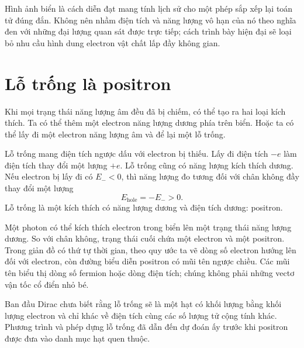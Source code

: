 Hình ảnh biển là cách diễn đạt mang tính lịch sử cho một phép sắp xếp lại toán tử đúng đắn. Không nên nhầm điện tích và năng lượng vô hạn của nó theo nghĩa đen với những đại lượng quan sát được trực tiếp; cách trình bày hiện đại sẽ loại bỏ nhu cầu hình dung electron vật chất lấp đầy không gian.

\section{Lỗ trống là positron}

Khi mọi trạng thái năng lượng âm đều đã bị chiếm, có thể tạo ra hai loại kích thích. Ta có thể thêm một electron năng lượng dương phía trên biển. Hoặc ta có thể lấy đi một electron năng lượng âm và để lại một lỗ trống.

Lỗ trống mang điện tích ngược dấu với electron bị thiếu. Lấy đi điện tích \(-e\) làm điện tích thay đổi một lượng \(+e\). Lỗ trống cũng có năng lượng kích thích dương. Nếu electron bị lấy đi có \(E_-<0\), thì năng lượng đo tương đối với chân không đầy thay đổi một lượng
\begin{equation}
E_{\mathrm{hole}}=-E_->0.
\end{equation}
Lỗ trống là một kích thích có năng lượng dương và điện tích dương: positron.

Một photon có thể kích thích electron trong biển lên một trạng thái năng lượng dương. So với chân không, trạng thái cuối chứa một electron và một positron. Trong giản đồ có thứ tự thời gian, theo quy ước ta vẽ dòng số electron hướng lên đối với electron, còn đường biểu diễn positron có mũi tên ngược chiều. Các mũi tên biểu thị dòng số fermion hoặc dòng điện tích; chúng không phải những vectơ vận tốc cổ điển nhỏ bé.

\begin{classroomqa}
\end{classroomqa}

Ban đầu Dirac chưa biết rằng lỗ trống sẽ là một hạt có khối lượng bằng khối lượng electron và chỉ khác về điện tích cùng các số lượng tử cộng tính khác. Phương trình và phép dựng lỗ trống đã dẫn đến dự đoán ấy trước khi positron được đưa vào danh mục hạt quen thuộc.

